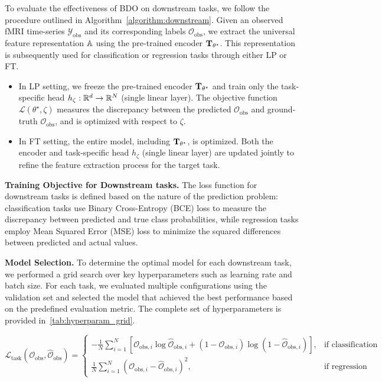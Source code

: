  To evaluate the effectiveness of BDO on downstream tasks, we follow the procedure outlined in Algorithm~\ref{algorithm:downstream}. Given an observed fMRI time-series $\mathcal{Y}_{\text{obs}}$ and its corresponding labels $\mathcal{O}_{\text{obs}}$, we extract the universal feature representation $\mathbb{A}$ using the pre-trained encoder $\mathbf{T}_{\theta^{\star}}$. This representation is subsequently used for classification or regression tasks through either LP or FT.
\begin{itemize}[leftmargin=10pt]
\item In LP setting, we freeze the pre-trained encoder $\mathbf{T}_{\theta^{\star}}$ and train only the task-specific head $h_{\zeta} : \mathbb{R}^d \to \mathbb{R}^N$ (single linear layer). The objective function $\mathcal{L}(\theta^{\star}, \zeta)$ measures the discrepancy between the predicted $\hat{\mathcal{O}}_{\text{obs}}$ and ground-truth $\mathcal{O}_{\text{obs}}$, and is optimized with respect to $\zeta$.
\item In FT setting, the entire model, including $\mathbf{T}_{\theta^{\star}}$, is optimized. Both the encoder and task-specific head $h_{\zeta}$ (single linear layer) are updated jointly to refine the feature extraction process for the target task.
\end{itemize}
\textbf{Training Objective for Downstream tasks. } The loss function for downstream tasks is defined based on the nature of the prediction problem: classification tasks use Binary Cross-Entropy (BCE) loss to measure the discrepancy between predicted and true class probabilities, while regression tasks employ Mean Squared Error (MSE) loss to minimize the squared differences between predicted and actual values.

\textbf{Model Selection. }  
To determine the optimal model for each downstream task, we performed a grid search over key hyperparameters such as learning rate and batch size. For each task, we evaluated multiple configurations using the validation set and selected the model that achieved the best performance based on the predefined evaluation metric. The complete set of hyperparameters is provided in~\cref{tab:hyperparam_grid}.



\begin{equation}
\mathcal{L}_{\text{task}}(\mathcal{O}_{\text{obs}}, \hat{\mathcal{O}}_{\text{obs}}) =
\begin{cases}
    -\frac{1}{N} \sum_{i=1}^{N} \left[ \mathcal{O}_{\text{obs}, i} \log \hat{\mathcal{O}}_{\text{obs}, i} + (1 - \mathcal{O}_{\text{obs}, i}) \log (1 - \hat{\mathcal{O}}_{\text{obs}, i}) \right], & \text{if classification} \\
    \frac{1}{N} \sum_{i=1}^{N} (\mathcal{O}_{\text{obs}, i} - \hat{\mathcal{O}}_{\text{obs}, i})^2, & \text{if regression}
\end{cases}
\label{eq:downstream_task_loss}
\end{equation}



